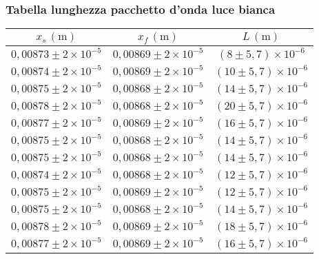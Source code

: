 \subsubsection{Tabella lunghezza pacchetto d'onda luce bianca}
    \begin{table}[H]
    \centering
        \begin{tabular}{|c|c|c|}
        \hline
        $ x_s \, (\text{m}) $ & $ x_f \, (\text{m}) $ & $ L \, (\text{m}) $ \\
        \hline
        $0,00873 \pm 2 \times 10^{-5}$ & $0,00869 \pm 2 \times 10^{-5}$ & $(8 \pm 5,7) \times 10^{-6}$ \\
        \hline
        $0,00874 \pm 2 \times 10^{-5}$ & $0,00869 \pm 2 \times 10^{-5}$ & $(10 \pm 5,7) \times 10^{-6}$ \\
        \hline
        $0,00875 \pm 2 \times 10^{-5}$ & $0,00868 \pm 2 \times 10^{-5}$ & $(14 \pm 5,7) \times 10^{-6}$ \\
        \hline
        $0,00878 \pm 2 \times 10^{-5}$ & $0,00868 \pm 2 \times 10^{-5}$ & $(20 \pm 5,7) \times 10^{-6}$ \\
        \hline
        $0,00877 \pm 2 \times 10^{-5}$ & $0,00869 \pm 2 \times 10^{-5}$ & $(16 \pm 5,7) \times 10^{-6}$ \\
        \hline
        $0,00875 \pm 2 \times 10^{-5}$ & $0,00868 \pm 2 \times 10^{-5}$ & $(14 \pm 5,7) \times 10^{-6}$ \\
        \hline
        $0,00875 \pm 2 \times 10^{-5}$ & $0,00868 \pm 2 \times 10^{-5}$ & $(14 \pm 5,7) \times 10^{-6}$ \\
        \hline
        $0,00874 \pm 2 \times 10^{-5}$ & $0,00868 \pm 2 \times 10^{-5}$ & $(12 \pm 5,7) \times 10^{-6}$ \\
        \hline
        $0,00875 \pm 2 \times 10^{-5}$ & $0,00869 \pm 2 \times 10^{-5}$ & $(12 \pm 5,7) \times 10^{-6}$ \\
        \hline
        $0,00875 \pm 2 \times 10^{-5}$ & $0,00868 \pm 2 \times 10^{-5}$ & $(14 \pm 5,7) \times 10^{-6}$ \\
        \hline
        $0,00878 \pm 2 \times 10^{-5}$ & $0,00869 \pm 2 \times 10^{-5}$ & $(18 \pm 5,7) \times 10^{-6}$ \\
        \hline
        $0,00877 \pm 2 \times 10^{-5}$ & $0,00869 \pm 2 \times 10^{-5}$ & $(16 \pm 5,7) \times 10^{-6}$ \\
        \hline
        \end{tabular}
    \end{table}
